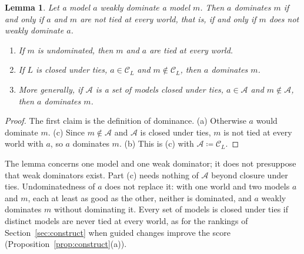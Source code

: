 \documentclass[11pt]{article}
\newtheorem{lemma}[theorem]{Lemma}
\theoremstyle{definition}
\theoremstyle{remark}
\newcommand{\C}{\mathcal C}
\begin{document}
\begin{lemma}\label{lem:ties}
Let a model $a$ weakly dominate a model $m$. Then $a$ dominates $m$ if and only if $a$ and $m$ are not tied at every world, that is, if and only if $m$ does not weakly dominate $a$.
\begin{enumerate}[label=(\alph*)]
\item If $m$ is undominated, then $m$ and $a$ are tied at every world.
\item If $L$ is closed under ties, $a\in\C_L$ and $m\notin\C_L$, then $a$ dominates $m$.
\item More generally, if $\mathcal A$ is a set of models closed under ties, $a\in\mathcal A$ and $m\notin\mathcal A$, then $a$ dominates $m$.
\end{enumerate}
\end{lemma}
\begin{proof}
The first claim is the definition of dominance. (a) Otherwise $a$ would dominate $m$. (c) Since $m\notin\mathcal A$ and $\mathcal A$ is closed under ties, $m$ is not tied at every world with $a$, so $a$ dominates $m$. (b) This is (c) with $\mathcal A\coloneqq\C_L$.
\end{proof}
The lemma concerns one model and one weak dominator; it does not presuppose that weak dominators exist. Part (c) needs nothing of $\mathcal A$ beyond closure under ties. Undominatedness of $a$ does not replace it: with one world and two models $a$ and $m$, each at least as good as the other, neither is dominated, and $a$ weakly dominates $m$ without dominating it. Every set of models is closed under ties if distinct models are never tied at every world, as for the rankings of Section~\ref{sec:construct} when guided changes improve the score (Proposition~\ref{prop:construct}(a)).
\end{document}
